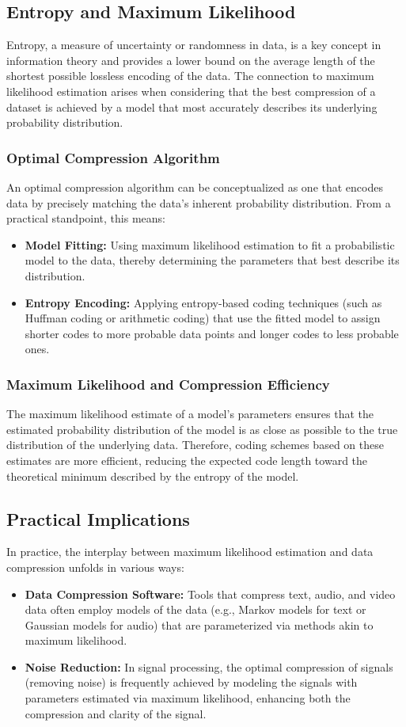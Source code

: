 \subsection{Entropy and Maximum Likelihood}
Entropy, a measure of uncertainty or randomness in data, is a key concept in information theory and provides a lower bound on the average length of the shortest possible lossless encoding of the data. The connection to maximum likelihood estimation arises when considering that the best compression of a dataset is achieved by a model that most accurately describes its underlying probability distribution.

\subsubsection{Optimal Compression Algorithm}
An optimal compression algorithm can be conceptualized as one that encodes data by precisely matching the data's inherent probability distribution. From a practical standpoint, this means:
\begin{itemize}
    \item \textbf{Model Fitting:} Using maximum likelihood estimation to fit a probabilistic model to the data, thereby determining the parameters that best describe its distribution.
    \item \textbf{Entropy Encoding:} Applying entropy-based coding techniques (such as Huffman coding or arithmetic coding) that use the fitted model to assign shorter codes to more probable data points and longer codes to less probable ones.
\end{itemize}

\subsubsection{Maximum Likelihood and Compression Efficiency}
The maximum likelihood estimate of a model’s parameters ensures that the estimated probability distribution of the model is as close as possible to the true distribution of the underlying data. Therefore, coding schemes based on these estimates are more efficient, reducing the expected code length toward the theoretical minimum described by the entropy of the model.

\subsection{Practical Implications}
In practice, the interplay between maximum likelihood estimation and data compression unfolds in various ways:
\begin{itemize}
    \item \textbf{Data Compression Software:} Tools that compress text, audio, and video data often employ models of the data (e.g., Markov models for text or Gaussian models for audio) that are parameterized via methods akin to maximum likelihood.
    \item \textbf{Noise Reduction:} In signal processing, the optimal compression of signals (removing noise) is frequently achieved by modeling the signals with parameters estimated via maximum likelihood, enhancing both the compression and clarity of the signal.
\end{itemize}

